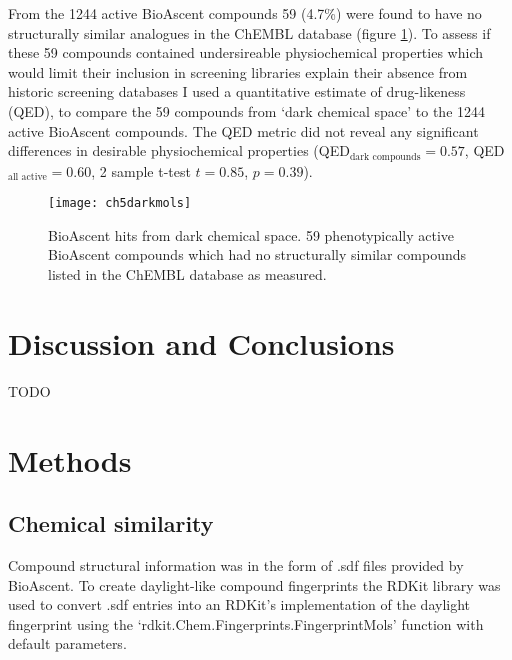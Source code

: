 \documentclass[a4paper,11pt,twoside,openright]{scrbook}
\begin{document}
From the 1244 active BioAscent compounds 59 (4.7\%) were found to have no structurally similar analogues in the ChEMBL database (figure \ref{figure:dark_mols}).
To assess if these 59 compounds contained undersireable physiochemical properties which would limit their inclusion in screening libraries explain their absence from historic screening databases I used a quantitative estimate of drug-likeness (QED), \cite{Bickerton2012} to compare the 59 compounds from `dark chemical space' to the 1244 active BioAscent compounds.
The QED metric did not reveal any significant differences in desirable physiochemical properties (QED$_{\text{dark compounds}} = 0.57$,  QED$_{\text{all active}} = 0.60$, 2 sample t-test $t=0.85$, $p=0.39$).


\begin{figure}
    \captionsetup{width=1.0\textwidth}
    \caption[BioAscent hits from dark chemical space]{
BioAscent hits from dark chemical space.
59 phenotypically active BioAscent compounds which had no structurally similar compounds listed in the ChEMBL database as measured.
}
    \texttt{[image: ch5darkmols]}
    \label{figure:dark_mols}
\end{figure}



\section{Discussion and Conclusions}
TODO


\section{Methods}

\subsection{Chemical similarity}
Compound structural information was in the form of .sdf files provided by BioAscent.
To create daylight-like compound fingerprints the RDKit library was used to convert .sdf entries into an RDKit's implementation of the daylight fingerprint using the `rdkit.Chem.Fingerprints.FingerprintMols' function with default parameters.
\end{document}
